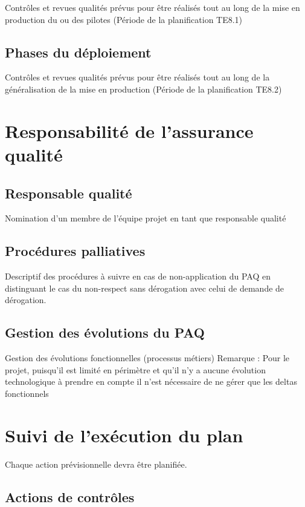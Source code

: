 \documentclass[a4paper, 10pt, oneside]{report}
\begin{document}
Contrôles et revues qualités prévus pour être réalisés tout au long de la mise en production du ou des pilotes (Période de la planification TE8.1)

\section{Phases du déploiement}

Contrôles et revues qualités prévus pour être réalisés tout au long de la généralisation de la mise en production (Période de la planification TE8.2)

\chapter{Responsabilité de l’assurance qualité}

\section{Responsable qualité}

Nomination d’un membre de l’équipe projet en tant que responsable qualité

\section{Procédures palliatives}

Descriptif des procédures à suivre en cas de non-application du PAQ en distinguant le cas du non-respect sans dérogation avec celui de demande de dérogation.

\section{Gestion des évolutions du PAQ}

Gestion des évolutions fonctionnelles (processus métiers)
Remarque : Pour le projet, puisqu’il est limité en périmètre et qu’il n’y a aucune évolution technologique à prendre en compte il n’est nécessaire de ne gérer que les deltas fonctionnels

\chapter{Suivi de l’exécution du plan}

Chaque action prévisionnelle devra être planifiée.

\section{Actions de contrôles}
\end{document}
